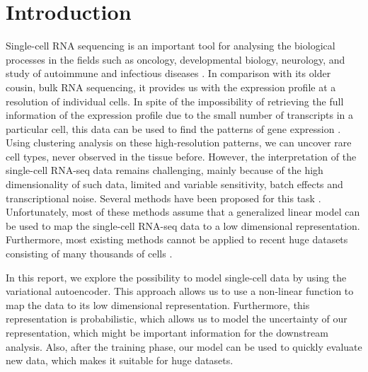 \chapter{Introduction}
\label{chap:intro}

Single-cell RNA sequencing is an important tool for analysing the biological processes in the fields such as oncology, developmental biology, neurology, and study of autoimmune and infectious diseases \cite{patel2014single}.
In comparison with its older cousin, bulk RNA sequencing, it provides us with the expression profile at a resolution of individual cells.
In spite of the impossibility of retrieving the full information of the expression profile due to the small number of transcripts in a particular cell, this data can be used to find the patterns of gene expression \cite{lopez2018scvi}.
Using clustering analysis on these high-resolution patterns, we can uncover rare cell types, never observed in the tissue before.
However, the interpretation of the single-cell RNA-seq data remains challenging, mainly because of the high dimensionality of such data, limited and variable sensitivity, batch effects and transcriptional noise.
Several methods have been proposed for this task \cite{pierson2015zifa}.
Unfortunately, most of these methods assume that a generalized linear model can be used to map the single-cell RNA-seq data to a low dimensional representation.
Furthermore, most existing methods cannot be applied to recent huge datasets consisting of many thousands of cells \cite{regev2017science}.

In this report, we explore the possibility to model single-cell data by using the variational autoencoder.
This approach allows us to use a non-linear function to map the data to its low dimensional representation.
Furthermore, this representation is probabilistic, which allows us to model the uncertainty of our representation, which might be important information for the downstream analysis.
Also, after the training phase, our model can be used to quickly evaluate new data, which makes it suitable for huge datasets.

